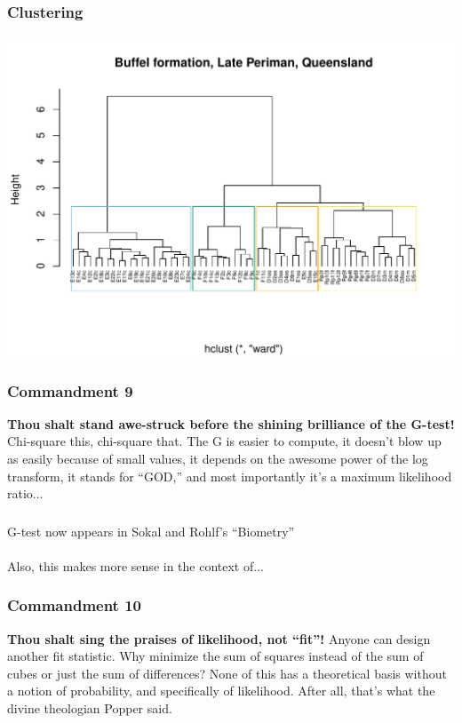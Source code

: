 \documentclass{beamer}\usepackage{graphicx, color}
\makeatletter
\def\maxwidth{ %
  \ifdim\Gin@nat@width>\linewidth
    \linewidth
  \else
    \Gin@nat@width
  \fi
}
\newenvironment{knitrout}{}{} %
\makeatother
\begin{document}
\begin{frame}
\frametitle{Clustering}

\begin{knitrout}
\color{fgcolor}\includegraphics[width=\maxwidth]{figure/cluster} 
\end{knitrout}


\end{frame}


\begin{frame}
\frametitle{Commandment 9}
\textbf{Thou shalt stand awe-struck before the shining brilliance of the G-test!} 
Chi-square this, chi-square that. 
The G is easier to compute, it doesn't blow up as easily because of small values, it depends on the awesome power of the log transform, it stands for ``GOD,'' and most importantly it's a maximum likelihood ratio...
\end{frame}


\begin{frame}
\frametitle{}
G-test now appears in Sokal and Rohlf's ``Biometry''
\\~\\
Also, this makes more sense in the context of...
\end{frame}


\begin{frame}
\frametitle{Commandment 10}
\textbf{Thou shalt sing the praises of likelihood, not ``fit''!} 
Anyone can design another fit statistic. 
Why minimize the sum of squares instead of the sum of cubes or just the sum of differences? 
None of this has a theoretical basis without a notion of probability, and specifically of likelihood. 
After all, that's what the divine theologian Popper said.
\end{frame}
\end{document}
